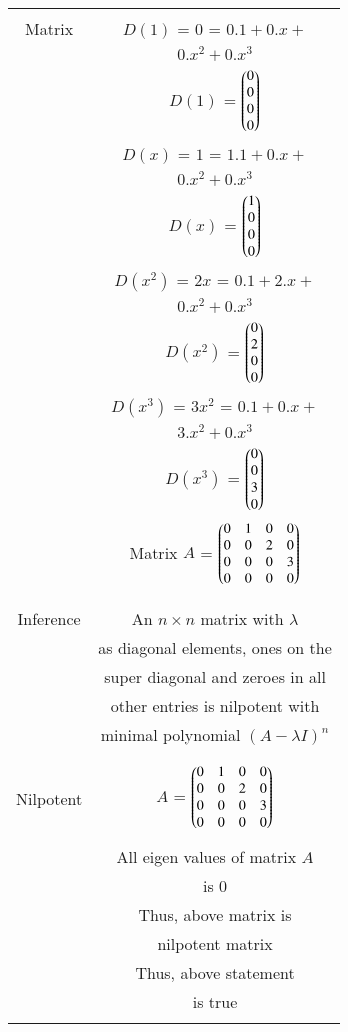 \begin{table*}[ht!]
\begin{center}
\begin{tabular}{|c|c|}
\hline
&\\
Matrix & $D(1)$ = $0$ = $0.1+0.x+$\\
& $0.x^2+0.x^3$\\
& $D(1)$ = $\begin{pmatrix}0\\0\\0\\0\end{pmatrix}$ \\
& $D(x)$ = $1$ = $1.1+0.x+$\\
& $0.x^2+0.x^3$\\
& $D(x)$ = $\begin{pmatrix}1\\0\\0\\0\end{pmatrix}$ \\
& $D(x^2)$ = $2x$ = $0.1+2.x+$\\
& $0.x^2+0.x^3$\\
& $D(x^2)$ = $\begin{pmatrix}0\\2\\0\\0\end{pmatrix}$ \\
& $D(x^3)$ = $3x^2$ = $0.1+0.x+$\\
& $3.x^2+0.x^3$\\
& $D(x^3)$ = $\begin{pmatrix}0\\0\\3\\0\end{pmatrix}$ \\
& Matrix $A$ = $\begin{pmatrix}0&1&0&0\\
                0&0&2&0\\
                0&0&0&3\\
                0&0&0&0\end{pmatrix}$\\
&\\
\hline
& \\
Inference & An $n\times n$ matrix with $\lambda$\\
& as diagonal elements, ones on the\\
& super diagonal and zeroes in all\\
& other entries is nilpotent with\\
& minimal polynomial $(A-\lambda I)^n$\\
&\\
\hline
& \\
Nilpotent & $A$ = $\begin{pmatrix}0&1&0&0\\
                0&0&2&0\\
                0&0&0&3\\
                0&0&0&0\end{pmatrix}$\\
& \\
& All eigen values of matrix $A$\\
& is $0$\\
& Thus, above matrix is \\
& nilpotent matrix \\
& Thus, above statement \\
& is true\\
& \\
\hline
\end{tabular}
\end{center}
\caption{}
\label{eq:solutions/2017/dec/76/table2}
\end{table*}
